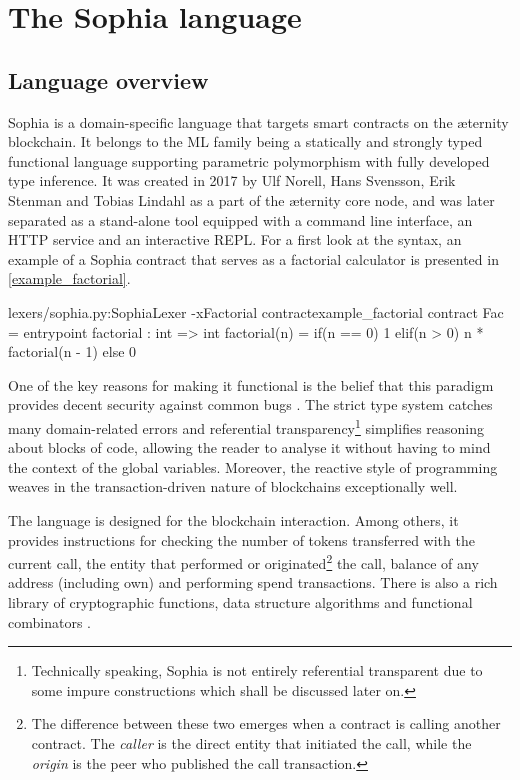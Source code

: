 \chapter{The Sophia language}
\label{chapter_sophia}

\section{Language overview}

Sophia is a domain-specific language that targets smart contracts on the
{\ae}ternity blockchain. It belongs to the ML family being a statically and
strongly typed functional language supporting parametric polymorphism with fully
developed type inference. It was created in 2017 by Ulf Norell, Hans Svensson,
Erik Stenman and Tobias Lindahl as a part of the {\ae}ternity core node, and was
later separated as a stand-alone tool equipped with a command line interface, an
HTTP service and an interactive REPL. For a first look at the syntax, an example
of a Sophia contract that serves as a factorial calculator is presented in
\autoref{example_factorial}.

\begin{code}[!hbt]{lexers/sophia.py:SophiaLexer -x}{Factorial contract}{example_factorial}
contract Fac =
  entrypoint
    factorial : int => int
    factorial(n) =
      if(n == 0) 1
      elif(n > 0) n * factorial(n - 1)
      else 0
\end{code}

One of the key reasons for making it functional is the belief that this paradigm
provides decent security against common bugs \cite{Hughes89whyfunctional}. The
strict type system catches many domain-related errors and referential
transparency\footnote{Technically speaking, Sophia is not entirely referential
  transparent due to some impure constructions which shall be discussed later
  on.} simplifies reasoning about blocks of code, allowing the reader to analyse
it without having to mind the context of the global variables. Moreover, the
reactive style of programming weaves in the transaction-driven nature of
blockchains exceptionally well.

The language is designed for the blockchain interaction. Among others, it
provides instructions for checking the number of tokens transferred with the
current call, the entity that performed or originated\footnote{The difference
  between these two emerges when a contract is calling another contract. The
  \emph{caller} is the direct entity that initiated the call, while the
  \emph{origin} is the peer who published the call transaction.} the call,
balance of any address (including own) and performing spend transactions. There
is also a rich library of cryptographic functions, data structure algorithms and
functional combinators \cite{sophia_stdlib}.

